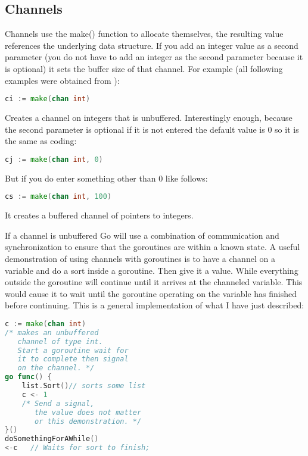\subsection{Channels}
Channels use the make() function to allocate themselves, the resulting value references the underlying data structure. If you add an integer value as a second parameter (you do not have to add an integer as the second parameter because it is optional) it sets the buffer size of that channel. For example (all following examples were obtained from \cite{website:go-lang-documentation}): 
\begin{lstlisting}[language=Go]
ci := make(chan int)
\end{lstlisting}

Creates a channel on integers that is unbuffered. Interestingly enough, because the second parameter is optional if it is not entered the default value is 0 so it is the same as coding:
\begin{lstlisting}[language=Go]
cj := make(chan int, 0)
\end{lstlisting}
But if you do enter something other than 0 like follows:
\begin{lstlisting}[language=Go]
cs := make(chan int, 100) 
\end{lstlisting}
It creates a buffered channel of pointers to integers. 

If a channel is unbuffered Go will use a combination of communication and synchronization to ensure that the goroutines are within a known state.  A useful demonstration of using channels with goroutines is to have a channel on a variable and do a sort inside a goroutine. Then give it a value. While everything outside the goroutine will continue until it arrives at the channeled variable. This would cause it to wait until the goroutine operating on the variable has finished before continuing.  This is a general implementation of what I have just described:
\begin{lstlisting}[language=Go]
c := make(chan int)  
/* makes an unbuffered 
   channel of type int.
   Start a goroutine wait for
   it to complete then signal 
   on the channel. */
go func() {
    list.Sort()// sorts some list 
    c <- 1  
    /* Send a signal, 
       the value does not matter 
       or this demonstration. */
}()
doSomethingForAWhile()
<-c   // Waits for sort to finish; 
\end{lstlisting}


